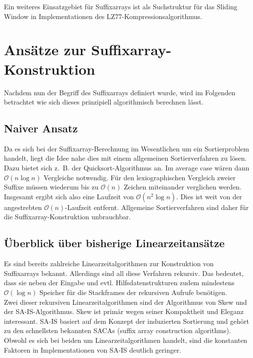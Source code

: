 \documentclass[twoside,11pt]{article}
\theoremstyle{break}
\begin{document}
Ein weiteres Einsatzgebiet für Suffixarrays ist als Suchstruktur für das Sliding Window in Implementationen des LZ77-Kompressionsalgorithmus.

\section{Ansätze zur Suffixarray-Konstruktion}

Nachdem nun der Begriff des Suffixarrays definiert wurde, wird im Folgenden betrachtet wie sich dieses prinzipiell algorithmisch berechnen lässt.

\subsection{Naiver Ansatz}

Da es sich bei der Suffixarray-Berechnung im Wesentlichen um ein Sortierproblem handelt, liegt die Idee nahe dies mit einem allgemeinen Sortierverfahren zu lösen. Dazu bietet sich z.~B. der Quicksort-Algorithmus an. Im average case wären dann $\mathcal{O}(n \log n)$ Vergleiche notwendig. Für den lexiographischen Vergleich zweier Suffixe müssen wiederum bis zu $\mathcal{O}(n)$ Zeichen miteinander verglichen werden. Insgesamt ergibt sich also eine Laufzeit von $\mathcal{O}(n^2 \log n)$. Dies ist weit von der angestrebten $\mathcal{O}(n)$-Laufzeit entfernt. Allgemeine Sortierverfahren sind daher für die Suffixarray-Konstruktion unbrauchbar.

\subsection{Überblick über bisherige Linearzeitansätze}

Es sind bereits zahlreiche Linearzeitalgorithmen zur Konstruktion von Suffixarrays bekannt. Allerdings sind all diese Verfahren rekursiv. Das bedeutet, dass sie neben der Eingabe und evtl. Hilfsdatenstrukturen zudem mindestens $\mathcal{O}(\log n)$ Speicher für die Stackframes der rekursiven Aufrufe benötigen.\\

Zwei dieser rekursiven Linearzeitalgorithmen sind der Algorithmus von Skew und der SA-IS-Algorithmus. Skew ist primär wegen seiner Kompaktheit und Eleganz interessant. SA-IS basiert auf dem Konzept der induzierten Sortierung und gehört zu den schnellsten bekannten SACAs (suffix array construction algorithms). Obwohl es sich bei beiden um Linearzeitalgorithmen handelt, sind die konstanten Faktoren in Implementationen von SA-IS deutlich geringer.
\end{document}
